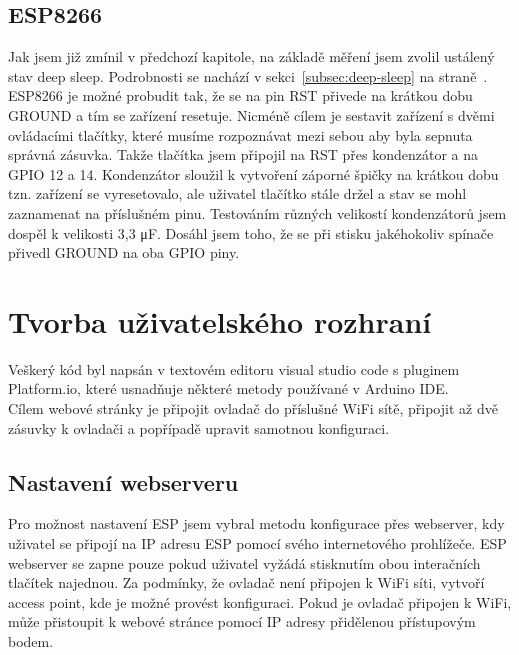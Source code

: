 \documentclass[a4paper, 12pt]{report}
\begin{document}
    \subsection{ESP8266}
    Jak jsem již zmínil v předchozí kapitole, na základě měření jsem zvolil ustálený stav deep sleep. Podrobnosti se nachází v sekci~\ref{subsec:deep-sleep} na straně~\pageref{subsec:deep-sleep}. ESP8266 je možné probudit tak, že se na pin RST přivede na krátkou dobu GROUND a tím se zařízení resetuje. Nicméně cílem je sestavit zařízení s dvěmi ovládacími tlačítky, které musíme rozpoznávat mezi sebou aby byla sepnuta správná zásuvka. Takže tlačítka jsem připojil na RST přes kondenzátor a na GPIO 12 a 14. Kondenzátor sloužil k vytvoření záporné špičky na krátkou dobu tzn. zařízení se vyresetovalo, ale uživatel tlačítko stále držel a stav se mohl zaznamenat na příslušném pinu. Testováním různých velikostí kondenzátorů jsem dospěl k velikosti 3,3 \si{\micro F}. Dosáhl jsem toho, že se při stisku jakéhokoliv spínače přivedl GROUND na oba GPIO piny.


    \section{Tvorba uživatelského rozhraní}
    Veškerý kód byl napsán v textovém editoru visual studio code s pluginem Platform.io, které usnadňuje některé metody používané v Arduino IDE.\\
    Cílem webové stránky je připojit ovladač do příslušné WiFi sítě, připojit až dvě zásuvky k ovladači a popřípadě upravit samotnou konfiguraci.

    \subsection{Nastavení webserveru}
    Pro možnost nastavení ESP jsem vybral metodu konfigurace přes webserver, kdy uživatel se připojí na IP adresu ESP pomocí svého internetového prohlížeče. ESP webserver se zapne pouze pokud uživatel vyžádá stisknutím obou interačních tlačítek najednou. Za podmínky, že ovladač není připojen k WiFi síti, vytvoří access point, kde je možné provést konfiguraci. Pokud je ovladač připojen k WiFi, může přistoupit k webové stránce pomocí IP adresy přidělenou přístupovým bodem.
\end{document}
